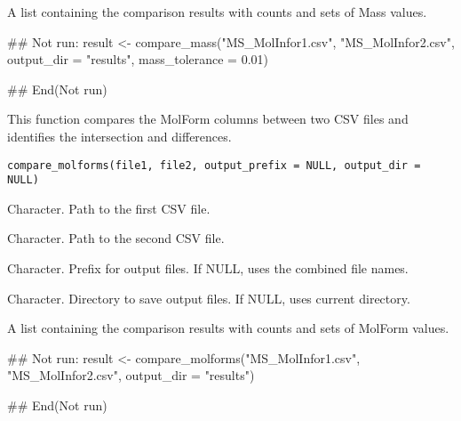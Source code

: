\documentclass[a4paper]{book}
\begin{document}
%
\begin{Value}
A list containing the comparison results with counts and sets of Mass values.
\end{Value}
%
\begin{Examples}
\begin{ExampleCode}
## Not run: 
result <- compare_mass("MS_MolInfor1.csv", "MS_MolInfor2.csv", 
                        output_dir = "results", mass_tolerance = 0.01)

## End(Not run)
\end{ExampleCode}
\end{Examples}
%
\begin{Description}
This function compares the MolForm columns between two CSV files and identifies
the intersection and differences.
\end{Description}
%
\begin{Usage}
\begin{verbatim}
compare_molforms(file1, file2, output_prefix = NULL, output_dir = NULL)
\end{verbatim}
\end{Usage}
%
\begin{Arguments}
\begin{ldescription}
\item[\code{file1}] Character. Path to the first CSV file.

\item[\code{file2}] Character. Path to the second CSV file.

\item[\code{output\_prefix}] Character. Prefix for output files. If NULL, uses the combined file names.

\item[\code{output\_dir}] Character. Directory to save output files. If NULL, uses current directory.
\end{ldescription}
\end{Arguments}
%
\begin{Value}
A list containing the comparison results with counts and sets of MolForm values.
\end{Value}
%
\begin{Examples}
\begin{ExampleCode}
## Not run: 
result <- compare_molforms("MS_MolInfor1.csv", "MS_MolInfor2.csv", output_dir = "results")

## End(Not run)
\end{ExampleCode}
\end{Examples}
\end{document}
